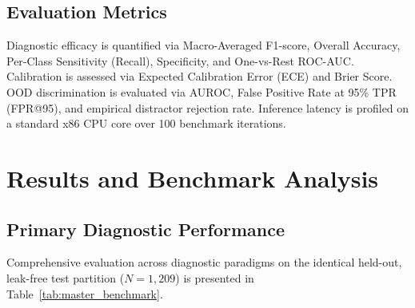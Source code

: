 \documentclass[conference]{IEEEtran}
\begin{document}
\subsection{Evaluation Metrics}
Diagnostic efficacy is quantified via Macro-Averaged F1-score, Overall Accuracy, Per-Class Sensitivity (Recall), Specificity, and One-vs-Rest ROC-AUC. Calibration is assessed via Expected Calibration Error (ECE) and Brier Score. OOD discrimination is evaluated via AUROC, False Positive Rate at 95\% TPR (FPR@95), and empirical distractor rejection rate. Inference latency is profiled on a standard x86 CPU core over 100 benchmark iterations.

\section{Results and Benchmark Analysis}

\subsection{Primary Diagnostic Performance}
Comprehensive evaluation across diagnostic paradigms on the identical held-out, leak-free test partition ($N=1{,}209$) is presented in Table~\ref{tab:master_benchmark}.

\begin{table}[htbp]
\caption{Diagnostic Benchmark on Leak-Free Test ($N=1{,}209$) and Hard Subsets ($n=374$)}
\centering\footnotesize
{}
\label{tab:master_benchmark}
\end{table}
\end{document}
